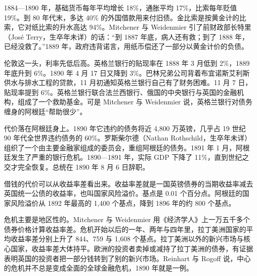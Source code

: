 1884—1890 年，基础货币每年平均增长 18\%，通胀平均 17\%，比索每年贬值 19\%\cite{mitchener2007}。到 80 年代末，多达 40\% 的外国借款用来付旧债\cite{mitchener2007}。金比索是按黄金计的比索，它对纸比索的升水高达 94\%\cite{mitchener2007}。Mitchener 与 Weidenmier 引了前财政部长特里（José Terry，生卒年未详）的话：“到 1887 年底，病人还有救；到了 1888 年，已经没救了。”\cite{mitchener2007}1889 年，政府违背诺言，用纸币偿还了一部分以黄金计价的负债\cite{mitchener2007}。

伦敦这一头，利率先低后高。英格兰银行的贴现率在 1888 年 3 月低到 2\%，1889 年底升到 6\%\cite{boe2017}。1890 年 4 月 17 日又降到 3\%\cite{boe2017}。巴林兄弟公司背着布宜诺斯艾利斯供水与排水工程的贷款，11 月初通知英格兰银行自己有了财务困难\cite{mitchener2007}。11 月 7 日，贴现率提到 6\%\cite{boe2017}。英格兰银行联合法兰西银行、俄国的中央银行与英国的金融机构，组成了一个救助基金\cite{mitchener2007}。可是 Mitchener 与 Weidenmier 说，英格兰银行对债务缠身的阿根廷“帮助很少”\cite{mitchener2007}。

代价落在阿根廷身上。1890 年它违约的债务将近 4,800 万英镑，几乎占 19 世纪 90 年代全世界违约债务的 60\%\cite{mitchener2007}。罗斯柴尔德（Nathan Rothschild，生卒年未详）组织了一个由主要金融家组成的委员会，重组阿根廷的债务\cite{mitchener2007}。1891 年 1 月，阿根廷发生了严重的银行危机\cite{mitchener2007}。1890—1891 年，实际 GDP 下降了 11\%，直到世纪之交才完全恢复\cite{mitchener2007}。总统在 1890 年 8 月 6 日辞职\cite{mitchener2007}。

借钱的代价可以从收益率差看出来。收益率差就是一国英镑债券的当期收益率减去英国统一公债的收益率，也叫国家风险溢价\cite{mitchener2007}。基点是 0.01 个百分点。阿根廷的国家风险溢价从 1892 年最高的 1,400 个基点，降到 1896 年的约 800 个基点\cite{mitchener2007}。

危机主要是地区性的。Mitchener 与 Weidenmier 用《经济学人》上一万五千多个债券价格计算收益率差\cite{mitchener2007}。危机开始以后的一年、两年与四年里，拉丁美洲国家的平均收益率差分别上升了 844、759 与 1,608 个基点\cite{mitchener2007}。拉丁美洲以外的新兴市场与核心国家，收益率差大体持平\cite{mitchener2007}。欧洲的投资者卖掉或减持了拉丁美洲的债券，有证据表明英国的投资者把一部分钱转到了别的新兴市场\cite{mitchener2007}。Reinhart 与 Rogoff 说，中心的危机并不总是变成全面的全球金融危机，1890 年就是一例\cite{reinhart2008tid}。

